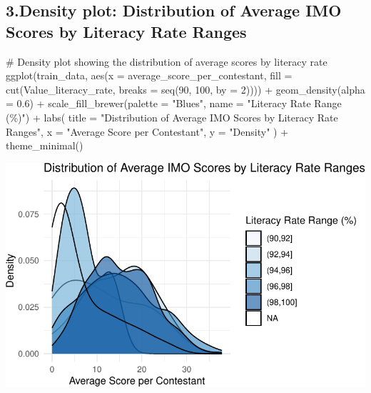 \documentclass[
  letterpaper,
  DIV=11,
  numbers=noendperiod]{scrartcl}
\newenvironment{Shaded}{\begin{snugshade}}{\end{snugshade}}
\newcommand{\AttributeTok}[1]{\textcolor[rgb]{0.40,0.45,0.13}{#1}}
\newcommand{\CommentTok}[1]{\textcolor[rgb]{0.37,0.37,0.37}{#1}}
\newcommand{\DecValTok}[1]{\textcolor[rgb]{0.68,0.00,0.00}{#1}}
\newcommand{\FloatTok}[1]{\textcolor[rgb]{0.68,0.00,0.00}{#1}}
\newcommand{\FunctionTok}[1]{\textcolor[rgb]{0.28,0.35,0.67}{#1}}
\newcommand{\NormalTok}[1]{\textcolor[rgb]{0.00,0.23,0.31}{#1}}
\newcommand{\SpecialCharTok}[1]{\textcolor[rgb]{0.37,0.37,0.37}{#1}}
\newcommand{\StringTok}[1]{\textcolor[rgb]{0.13,0.47,0.30}{#1}}
\begin{document}
\subsection{3.Density plot: Distribution of Average IMO Scores by
Literacy Rate
Ranges}\label{density-plot-distribution-of-average-imo-scores-by-literacy-rate-ranges}

\begin{Shaded}
\begin{Highlighting}[]
\CommentTok{\# Density plot showing the distribution of average scores by literacy rate}
\FunctionTok{ggplot}\NormalTok{(train\_data, }\FunctionTok{aes}\NormalTok{(}\AttributeTok{x =}\NormalTok{ average\_score\_per\_contestant, }\AttributeTok{fill =} \FunctionTok{cut}\NormalTok{(Value\_literacy\_rate, }\AttributeTok{breaks =} \FunctionTok{seq}\NormalTok{(}\DecValTok{90}\NormalTok{, }\DecValTok{100}\NormalTok{, }\AttributeTok{by =} \DecValTok{2}\NormalTok{)))) }\SpecialCharTok{+}
  \FunctionTok{geom\_density}\NormalTok{(}\AttributeTok{alpha =} \FloatTok{0.6}\NormalTok{) }\SpecialCharTok{+}
  \FunctionTok{scale\_fill\_brewer}\NormalTok{(}\AttributeTok{palette =} \StringTok{"Blues"}\NormalTok{, }\AttributeTok{name =} \StringTok{"Literacy Rate Range (\%)"}\NormalTok{) }\SpecialCharTok{+}
  \FunctionTok{labs}\NormalTok{(}
    \AttributeTok{title =} \StringTok{"Distribution of Average IMO Scores by Literacy Rate Ranges"}\NormalTok{,}
    \AttributeTok{x =} \StringTok{"Average Score per Contestant"}\NormalTok{,}
    \AttributeTok{y =} \StringTok{"Density"}
\NormalTok{  ) }\SpecialCharTok{+}
  \FunctionTok{theme\_minimal}\NormalTok{()}
\end{Highlighting}
\end{Shaded}

\includegraphics{proj_EDA_f24_sbekova_files/figure-pdf/unnamed-chunk-6-1.pdf}
\end{document}
